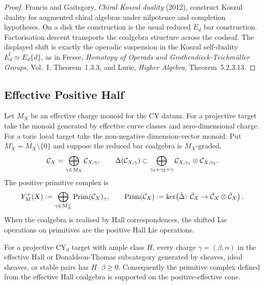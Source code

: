 \begin{proof}
Francis and Gaitsgory, \emph{Chiral Koszul duality} (2012), construct
Koszul duality for augmented chiral algebras under nilpotence and
completion hypotheses. On a disk the construction is the usual reduced
$E_d$ bar construction. Factorisation descent transports the coalgebra
structure across the cosheaf. The displayed shift is exactly the
operadic suspension in the Koszul self-duality
$E_d^!\simeq E_d\{d\}$, as in Fresse,
\emph{Homotopy of Operads and Grothendieck-Teichm\"uller Groups},
Vol.~I, Theorem~1.3.3, and Lurie, \emph{Higher Algebra},
Theorem~5.2.3.13.
\end{proof}

\subsection{Effective Positive Half}
\label{wn:subsec:positive-primitives}

\begin{definition}
\label{wn:def:positive-half}
Let $M_X$ be an effective charge monoid for the CY datum. For a
projective target take the monoid generated by effective curve classes
and zero-dimensional charge. For a toric local target take the
non-negative dimension-vector monoid. Put
$M_X^\circ=M_X\setminus\{0\}$ and suppose the reduced bar coalgebra is
$M_X$-graded,
\[
 \mathcal{C}_X=\bigoplus_{\gamma\in M_X}\mathcal{C}_{X,\gamma},
 \qquad
 \Delta(\mathcal{C}_{X,\gamma})
 \subset
 \bigoplus_{\gamma_1+\gamma_2=\gamma}
 \mathcal{C}_{X,\gamma_1}\otimes\mathcal{C}_{X,\gamma_2}.
\]
The positive primitive complex is
\[
 Y^{+}_M(X)
 :=
 \bigoplus_{\gamma\in M_X^\circ}
 \mathrm{Prim}(\mathcal{C}_X)_\gamma,
 \qquad
 \mathrm{Prim}(\mathcal{C}_X)
 :=
 \ker\!\left(
   \bar\Delta\colon \bar{\mathcal{C}}_X\to \bar{\mathcal{C}}_X\otimes\bar{\mathcal{C}}_X
 \right).
\]
When the coalgebra is realised by Hall correspondences, the shifted
Lie operations on primitives are the positive Hall Lie operations.
\end{definition}

\begin{lemma}
\label{wn:lem:effective-support}
For a projective CY$_d$ target with ample class $H$, every charge
$\gamma=(\beta,n)$ in the effective Hall or Donaldson-Thomas subcategory
generated by sheaves, ideal sheaves, or stable pairs has
$H\cdot\beta\geq0$. Consequently the primitive complex defined from the
effective Hall coalgebra is supported on the positive-effective cone.
\end{lemma}

